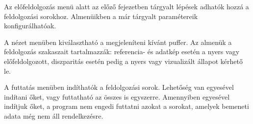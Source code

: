 Az előfeldolgozás menü alatt az előző fejezetben tárgyalt lépések adhatók hozzá a feldolgozási sorokhoz.
Almenüikben a már tárgyalt paramétereik konfigurálhatóak.

A nézet menüben kiválasztható a megjeleníteni kívánt puffer.
Az almenük a feldolgozás szakaszait tartalmazzák: referencia- és adatkép esetén a nyers vagy előfeldolgozott, diszparitás esetén pedig a nyers vagy vizualizált állapot kérhető le.

A futtatás menüben indíthatók a feldolgozási sorok.
Lehetőség van egyesével indítani őket, vagy futtatható az összes is egyszerre.
Amennyiben egyesével indítjuk őket, a program nem engedi futtatni azokat a sorokat, amelyek bemeneti adata még nem áll rendelkezésre.
